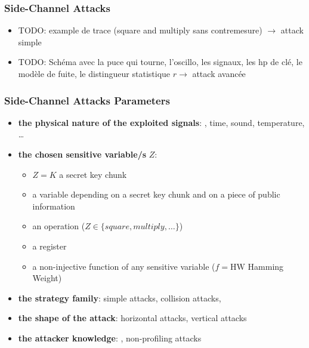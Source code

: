 \begin{frame}
\frametitle{Side-Channel Attacks}
\begin{itemize}
\item TODO: example de trace (square and multiply sans contremesure) $\rightarrow$ attack simple
\item TODO: Schéma avec la puce qui tourne, l'oscillo, les signaux, les hp de clé, le modèle de fuite, le distingueur statistique $r\rightarrow$ attack avancée

\end{itemize}
\end{frame}

\begin{frame}
\frametitle{Side-Channel Attacks Parameters}
\begin{itemize}
\item \textbf{the physical nature of the exploited signals}: , time, sound, temperature, \dots
\item \textbf{the chosen sensitive variable/s} $Z$:
\begin{itemize}
\item $Z = K$ a secret key chunk
\item {} a variable depending on a secret key chunk and on a piece of public information
\item an operation (\eg $Z \in \{ square, multiply, \dots\}$)
\item a register 
\item {} a non-injective function of any sensitive variable (\eg $f = \mathrm{HW}$ Hamming Weight)
\end{itemize}
\item \textbf{the strategy family}: simple attacks, collision attacks, 
\item \textbf{the shape of the attack}: horizontal attacks, vertical attacks
\item \textbf{the attacker knowledge}: , non-profiling attacks
\end{itemize}
\end{frame}




